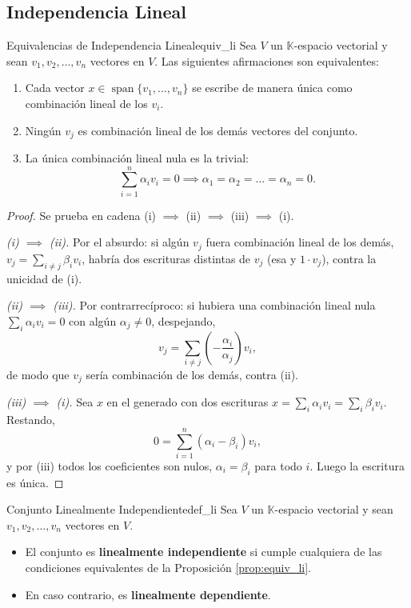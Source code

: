 \documentclass[11pt, a4paper]{article}
\begin{document}
\subsection{Independencia Lineal}

\begin{proposicion}{Equivalencias de Independencia Lineal}{equiv_li}
Sea $V$ un $\mathbb{K}$-espacio vectorial y sean $v_1, v_2, \dots, v_n$ vectores en $V$. Las siguientes afirmaciones son equivalentes:
\begin{enumerate}[label=(\roman*)] %
    \item Cada vector $x \in \operatorname{span}\{v_1, \dots, v_n\}$ se escribe de manera única como combinación lineal de los $v_i$.
    \item Ningún $v_j$ es combinación lineal de los demás vectores del conjunto.
    \item La única combinación lineal nula es la trivial:
    \[
    \sum_{i=1}^{n} \alpha_i v_i = 0 \implies \alpha_1 = \alpha_2 = \dots = \alpha_n = 0.
    \]
\end{enumerate}
\end{proposicion}

\begin{proof}
Se prueba en cadena (i) $\implies$ (ii) $\implies$ (iii) $\implies$ (i).

\textit{(i) $\implies$ (ii).} Por el absurdo: si algún $v_j$ fuera combinación lineal de los demás, $v_j = \sum_{i \neq j} \beta_i v_i$, habría dos escrituras distintas de $v_j$ (esa y $1 \cdot v_j$), contra la unicidad de (i).

\textit{(ii) $\implies$ (iii).} Por contrarrecíproco: si hubiera una combinación lineal nula $\sum_{i} \alpha_i v_i = 0$ con algún $\alpha_j \neq 0$, despejando,
\[
v_j = \sum_{i \neq j} \left( -\frac{\alpha_i}{\alpha_j} \right) v_i,
\]
de modo que $v_j$ sería combinación de los demás, contra (ii).

\textit{(iii) $\implies$ (i).} Sea $x$ en el generado con dos escrituras $x = \sum_{i} \alpha_i v_i = \sum_{i} \beta_i v_i$. Restando,
\[
0 = \sum_{i=1}^{n} (\alpha_i - \beta_i) v_i,
\]
y por (iii) todos los coeficientes son nulos, $\alpha_i = \beta_i$ para todo $i$. Luego la escritura es única.
\end{proof}

\begin{definicion}{Conjunto Linealmente Independiente}{def_li}
Sea $V$ un $\mathbb{K}$-espacio vectorial y sean $v_1, v_2, \dots, v_n$ vectores en $V$.
\begin{itemize}
    \item El conjunto es \textbf{linealmente independiente} si cumple cualquiera de las condiciones equivalentes de la Proposición \ref{prop:equiv_li}.
    \item En caso contrario, es \textbf{linealmente dependiente}.
\end{itemize}
\end{definicion}
\end{document}
